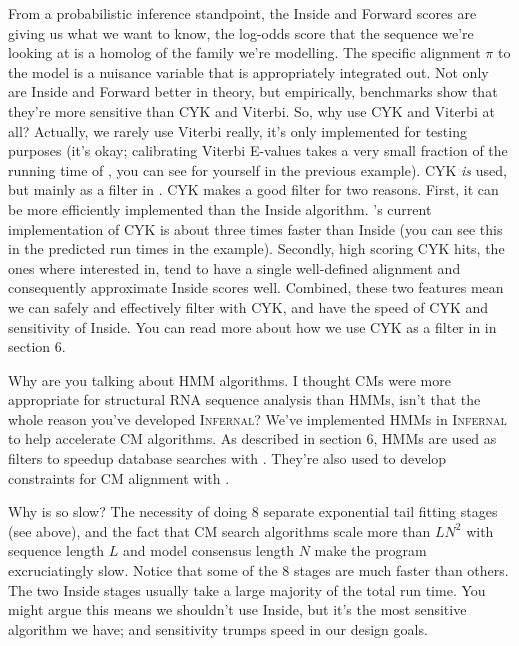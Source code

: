 From a probabilistic inference standpoint, the Inside and Forward
scores are giving us what we want to know, the log-odds score that the
sequence we're looking at is a homolog of the family we're
modelling. The specific alignment $\pi$ to the model is a nuisance
variable that is appropriately integrated out. Not only are Inside and
Forward better in theory, but empirically, benchmarks show that
they're more sensitive than CYK and Viterbi. So, why use CYK and
Viterbi at all?  Actually, we rarely use Viterbi really, it's
only implemented for testing purposes (it's okay; calibrating Viterbi
E-values takes a very small fraction of the running time of
, you can see for yourself in the previous
example). CYK \emph{is} used, but mainly as a filter in
. CYK makes a good filter for two reasons. First, it can be
more efficiently implemented than the Inside
algorithm. 's current implementation of CYK is
about three times faster than Inside (you can see this in the
predicted run times in the  example). Secondly,
high scoring CYK hits, the ones where interested in, tend to have a
single well-defined alignment and consequently approximate Inside
scores well. Combined, these two features mean we can safely and
effectively filter with CYK, and have the speed of CYK and sensitivity
of Inside. You can read more about how we use CYK as a filter in
 in section 6.


\begin{srefaq}{Why are you talking about HMM algorithms. I thought CMs
    were more appropriate for structural RNA sequence analysis than
    HMMs, isn't that the whole reason you've developed \textsc{Infernal}?} 
  We've implemented HMMs in \textsc{Infernal} to help accelerate CM
    algorithms. As described in section 6, HMMs are used as filters to
    speedup database searches with . They're also used to develop
    constraints for CM alignment with .  
\end{srefaq}


\begin{srefaq}{Why is  so slow?} The
    necessity of doing 8 separate exponential tail fitting stages
    (see above), and the fact that CM search algorithms scale more
    than $LN^2$ with sequence length $L$ and model consensus length
    $N$ make the program excruciatingly slow. Notice that some of the
    8 stages are much faster than others. The two Inside stages usually
    take a large majority of the total run time. You might argue this
    means we shouldn't use Inside, but it's the most sensitive
    algorithm we have; and sensitivity trumps speed in our design
    goals.
\end{srefaq}

